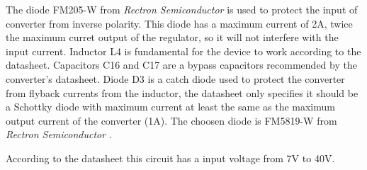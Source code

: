 			The diode FM205-W from \textit{Rectron Semiconductor} \cite{fm205-2-datasheet} is used to protect the input of converter from inverse polarity. This diode has a maximum current of 2A, twice the maximum curret output of the regulator, so it will not interfere with the input current. Inductor L4 is fundamental for the device to work according to the datasheet. Capacitors C16 and C17 are a bypass capacitors recommended by the converter's datasheet. Diode D3 is a catch diode used to protect the converter from flyback currents from the inductor, the datasheet only specifies it should be a Schottky diode with maximum current at least the same as the maximum output current of the converter (1A). The choosen diode is FM5819-W from \textit{Rectron Semiconductor} \cite{fm5819-w-datasheet}.
			\par
			According to the datasheet this circuit has a input voltage from 7V to 40V.

